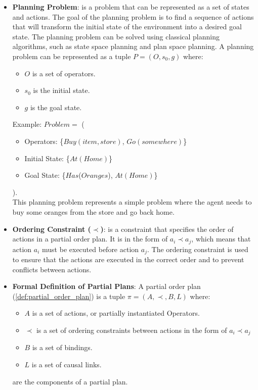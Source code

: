 \begin{itemize}
    \item \label{def:planning_problem}
          \textbf{Planning Problem}: is a problem that can be represented as a set of states and actions. The goal of the planning problem is to find a sequence of actions that will transform the initial state of the environment into a desired goal state. The planning problem can be solved using classical planning algorithms, such as state space planning and plan space planning. A planning problem can be represented as a tuple $P = (O, s_0, g)$ \cite{10.5555/975615} where:
          \begin{itemize}
              \item $O$ is a set of operators.
              \item $s_0$ is the initial state.
              \item $g$ is the goal state.
          \end{itemize}
          Example: $Problem =$ (
          \begin{itemize}
              \item Operators: \{$Buy(item,store)$, $Go(somewhere)$\}
              \item Initial State: \{$At(Home)$\}
              \item Goal State: \{$Has$($Oranges$), $At(Home)$\}
          \end{itemize}
          ).\\
          This planning problem represents a simple problem where the agent needs to buy some oranges from the store and go back home.

    \item  \label{def:ordering_constraint}
          \textbf{Ordering Constraint ($\prec$)}: is a constraint that specifies the order of actions in a partial order plan. It is in the form of $a_i \prec a_j$, which means that action $a_i$ must be executed before action $a_j$. The ordering constraint is used to ensure that the actions are executed in the correct order and to prevent conflicts between actions.

    \item  \label{def:formal_definition_partial_plan}
          \textbf{Formal Definition of Partial Plans}: A partial order plan (\ref{def:partial_order_plan}) is a tuple $\pi = (A, \prec, B, L)$ where: \cite{10.5555/975615}
          \begin{itemize}
              \item $A$ is a set of actions, or partially instantiated Operators.
              \item $\prec$ is a set of ordering constraints between actions in the form of $a_i \prec a_j$
              \item $B$ is a set of bindings.
              \item $L$ is a set of causal links.
          \end{itemize}
          are the components of a partial plan.



\end{itemize}
